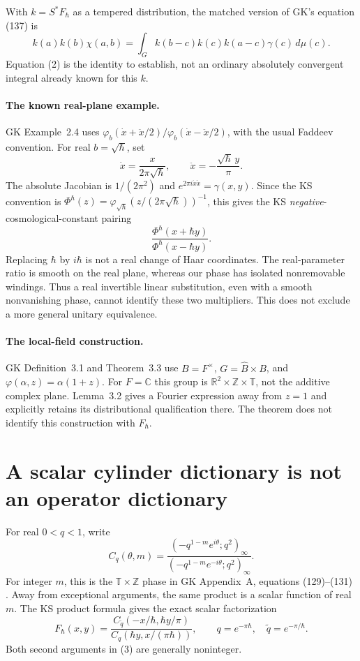 \documentclass[11pt,a4paper]{article}
\newcommand{\R}{\mathbb R}
\newcommand{\T}{\mathbb T}
\newcommand{\Z}{\mathbb Z}
\newcommand{\F}{F_\hbar}
\begin{document}
With $k=S^*\F$ as a tempered distribution, the matched version
of GK's equation (137) is
\[
 k(a)k(b)\chi(a,b)=
 \int_G k(b-c)k(c)k(a-c)\gamma(c)\,d\mu(c). \tag{2}
\]
Equation (2) is the identity to establish, not an ordinary absolutely
convergent integral already known for this $k$.

\paragraph{The known real-plane example.}
GK Example~2.4 uses
$\varphi_b(\dot x+\ddot x/2)/\varphi_b(\dot x-\ddot x/2)$, with the
usual Faddeev convention. For real $b=\sqrt\hbar$, set
\[
 \dot x=\frac{x}{2\pi\sqrt\hbar},\qquad
 \ddot x=-\frac{\sqrt\hbar\,y}{\pi}.
\]
The absolute Jacobian is $1/(2\pi^2)$ and
$e^{2\pi i\dot x\ddot x}=\gamma(x,y)$.
Since the KS convention is
$\Phi^\hbar(z)=\varphi_{\sqrt\hbar}(z/(2\pi\sqrt\hbar))^{-1}$,
this gives the KS \emph{negative}-cosmological-constant pairing
\[
 \frac{\Phi^\hbar(x+\hbar y)}{\Phi^\hbar(x-\hbar y)}.
\]
Replacing $\hbar$ by $i\hbar$ is not a real change of Haar coordinates.
The real-parameter ratio is smooth on the real plane, whereas our
phase has isolated nonremovable windings. Thus a real invertible
linear substitution, even with a smooth nonvanishing phase, cannot
identify these two multipliers. This does not exclude a more general
unitary equivalence.

\paragraph{The local-field construction.}
GK Definition~3.1 and Theorem~3.3 use $B=F^\times$,
$G=\widehat B\times B$, and $\varphi(\alpha,z)=\alpha(1+z)$.
For $F=\mathbb C$ this group is $\R^2\times\Z\times\T$, not
the additive complex plane. Lemma~3.2 gives a Fourier expression
away from $z=1$ and explicitly retains its distributional qualification
there. The theorem does not identify this construction with $\F$.

\newpage
\section{A scalar cylinder dictionary is not an operator dictionary}
For real $0<q<1$, write
\[
 C_q(\theta,m)=
 \frac{(-q^{1-m}e^{i\theta};q^2)_\infty}
      {(-q^{1-m}e^{-i\theta};q^2)_\infty}.
\]
For integer $m$, this is the $\T\times\Z$ phase in GK
Appendix~A, equations (129)--(131) \cite{index}. Away from exceptional
arguments, the same product is a scalar function of real $m$.
The KS product formula gives the exact scalar factorization
\[
 \F(x,y)=
 \frac{C_{\widetilde q}(-x/\hbar,\hbar y/\pi)}
      {C_q(\hbar y,x/(\pi\hbar))},\qquad
 q=e^{-\pi\hbar},\quad\widetilde q=e^{-\pi/\hbar}. \tag{3}
\]
Both second arguments in (3) are generally noninteger.
\end{document}
